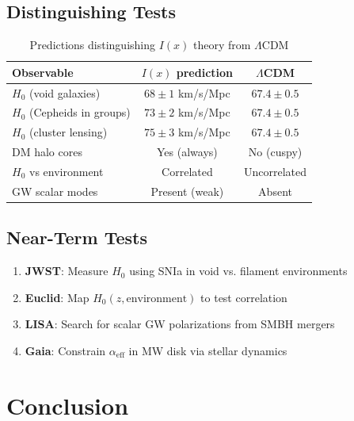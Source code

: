 \documentclass[12pt, a4paper]{article}
\begin{document}
\subsection{Distinguishing Tests}

\begin{table}[H]
\centering
\caption{Predictions distinguishing $I(x)$ theory from $\Lambda$CDM}
\begin{tabular}{lcc}
\toprule
\textbf{Observable} & \textbf{$I(x)$ prediction} & \textbf{$\Lambda$CDM} \\
\midrule
$H_0$ (void galaxies) & $68 \pm 1$ km/s/Mpc & $67.4 \pm 0.5$ \\
$H_0$ (Cepheids in groups) & $73 \pm 2$ km/s/Mpc & $67.4 \pm 0.5$ \\
$H_0$ (cluster lensing) & $75 \pm 3$ km/s/Mpc & $67.4 \pm 0.5$ \\
DM halo cores & Yes (always) & No (cuspy) \\
$H_0$ vs environment & Correlated & Uncorrelated \\
GW scalar modes & Present (weak) & Absent \\
\bottomrule
\end{tabular}
\end{table}

\subsection{Near-Term Tests}

\begin{enumerate}
    \item \textbf{JWST}: Measure $H_0$ using SNIa in void vs. filament environments
    \item \textbf{Euclid}: Map $H_0(z, \text{environment})$ to test correlation
    \item \textbf{LISA}: Search for scalar GW polarizations from SMBH mergers
    \item \textbf{Gaia}: Constrain $\alpha_{\text{eff}}$ in MW disk via stellar dynamics
\end{enumerate}


\section{Conclusion}
\end{document}
